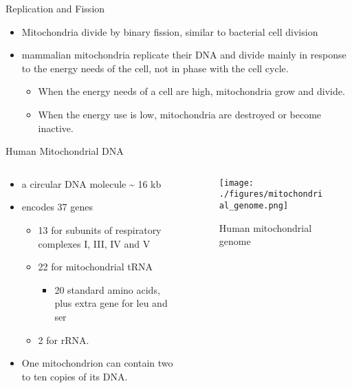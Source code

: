 \documentclass[presentation, smaller]{beamer}
\begin{document}
\begin{frame}[label={sec:org61b741b}]{Replication and Fission}
\begin{itemize}
\item Mitochondria divide by binary fission, similar to bacterial cell division

\item mammalian mitochondria replicate their DNA and divide mainly in response
to the energy needs of the cell, not in phase with the cell cycle.
\begin{itemize}
\item When the energy needs of a cell are high, mitochondria grow and
divide.
\item When the energy use is low, mitochondria are destroyed
or become inactive.
\end{itemize}
\end{itemize}
\end{frame}

\begin{frame}[label={sec:orgd0f2dda}]{Human Mitochondrial DNA}
\begin{columns}
\begin{column}{.7\columnwidth}
\begin{itemize}
\item a circular DNA molecule \textasciitilde{} 16 kb
\item encodes 37 genes
\begin{itemize}
\item 13 for subunits of respiratory complexes I, III, IV and V
\item 22 for mitochondrial tRNA
\begin{itemize}
\item 20 standard amino acids, plus extra gene for leu and ser
\end{itemize}
\item 2 for rRNA.
\end{itemize}
\item One mitochondrion can contain two to ten copies of its DNA.
\end{itemize}
\end{column}

\begin{column}{.3\columnwidth}
\begin{figure}[htbp]
\centering
\texttt{[image: ./figures/mitochondrial\_genome.png]}
\caption[mtdna]{\label{fig:orgc98abfe}
Human mitochondrial genome}
\end{figure}
\end{column}
\end{columns}
\end{frame}
\end{document}

